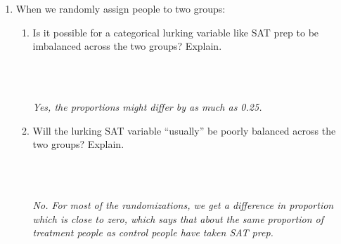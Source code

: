 \begin{enumerate}
\begin{enumerate}
\end{enumerate}

\item When we randomly assign people to two groups:
  \begin{enumerate}
  \item Is it possible for a categorical lurking variable like SAT prep
    to be imbalanced across the two groups?  Explain.
\begin{students}
    \vspace{1.5cm}\\
\end{students}
\begin{key}
  \\ {\it Yes, the proportions might differ by as much as 0.25.} 
\end{key}
  \item Will the lurking SAT variable ``usually'' be poorly balanced
    across the two groups?  Explain.
\begin{students}
        \vspace{1.5cm}\\
\end{students}
\begin{key}
  \\ {\it  No. For most of the randomizations, we get a difference in
    proportion which is close to zero, which says that about the same
    proportion of treatment people as control people have taken SAT prep. } 
\end{key}
  \end{enumerate}


\end{enumerate}
